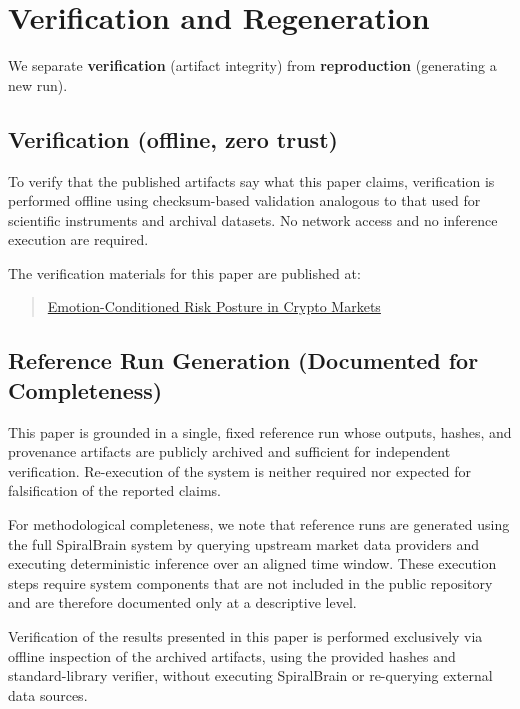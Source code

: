 \documentclass[12pt,a4paper]{article}
\begin{document}
\section{Verification and Regeneration}

We separate \textbf{verification} (artifact integrity) from \textbf{reproduction} (generating a new run).

\subsection{Verification (offline, zero trust)}

To verify that the published artifacts say what this paper claims, verification is performed
offline using checksum-based validation analogous to that used for scientific instruments
and archival datasets. No network access and no inference execution are required.

The verification materials for this paper are published at:
\begin{quote}
\href{https://github.com/jhcragin/SpiralBrain-v3.0-public/tree/main/Emotion-Conditioned%20Risk%20Posture%20in%20Crypto%20Markets}{Emotion-Conditioned Risk Posture in Crypto Markets}
\end{quote}


\subsection{Reference Run Generation (Documented for Completeness)}

This paper is grounded in a single, fixed reference run whose outputs, hashes, and provenance artifacts are publicly archived and sufficient for independent verification. Re-execution of the system is neither required nor expected for falsification of the reported claims.

For methodological completeness, we note that reference runs are generated using the full SpiralBrain system by querying upstream market data providers and executing deterministic inference over an aligned time window. These execution steps require system components that are not included in the public repository and are therefore documented only at a descriptive level.

Verification of the results presented in this paper is performed exclusively via offline inspection of the archived artifacts, using the provided hashes and standard-library verifier, without executing SpiralBrain or re-querying external data sources.
\end{document}
